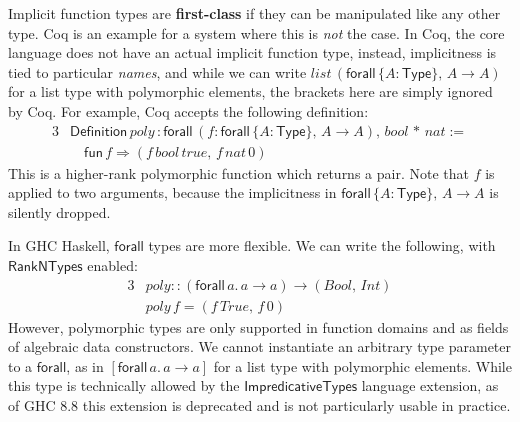 \documentclass[acmsmall,screen,dvipsnames]{acmart}\settopmatter{}
\newcommand{\kw}[1]{{\mathsf{#1}}}
\newcommand{\mi}[1]{\mathit{#1}}
\theoremstyle{remark}
\begin{document}
Implicit function types are \textbf{first-class} if they can be manipulated like any
other type. Coq is an example for a system where this is \emph{not} the case.
In Coq, the core language does not have an actual implicit function type,
instead, implicitness is tied to particular \emph{names}, and while we can write
$\mi{list}\,(\kw{forall}\,\{A : \kw{Type}\},\,A\to A)$ for a list type with
polymorphic elements, the brackets here are simply ignored by Coq. For example,
Coq accepts the following definition:
\begin{alignat*}{3}
  & \kw{Definition}\,poly\,: \kw{forall}\,(f : \kw{forall}\,\{A : \kw{Type}\},\,A\to A),\,\mi{bool}\,*\,\mi{nat} :=\\
  & \quad \kw{fun}\,f \Rightarrow (f\,\mi{bool}\,\mi{true},\,f\,\mi{nat}\,0)
\end{alignat*}
This is a higher-rank polymorphic function which returns a pair. Note that $f$
is applied to two arguments, because the implicitness in $\kw{forall}\,\{A :
\kw{Type}\},\,A\to A$ is silently dropped.

In GHC Haskell, $\kw{forall}$ types are more flexible. We can write the
following, with $\kw{RankNTypes}$ enabled:
\begin{alignat*}{3}
  & \mi{poly} :: (\kw{forall}\,a.\,a \to a) \to (\mi{Bool},\,\mi{Int}) \\
  & \mi{poly}\,f = (f\,\mi{True},\,f\,0)
\end{alignat*}
However, polymorphic types are only supported in function domains and as fields
of algebraic data constructors. We cannot instantiate an arbitrary type
parameter to a $\kw{forall}$, as in $[\kw{forall}\,a.\,a\to a]$ for a list type
with polymorphic elements. While this type is technically allowed by the
$\kw{ImpredicativeTypes}$ language extension, as of GHC 8.8 this extension is
deprecated and is not particularly usable in practice.
\end{document}
